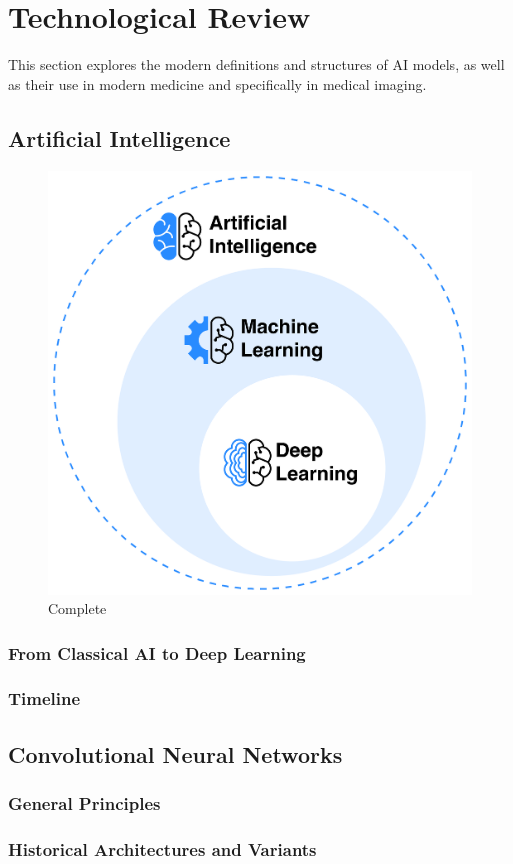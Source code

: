 \documentclass[a4paper,10pt]{book}
\begin{document}
\chapter{Technological Review}

This section explores the modern definitions and structures of AI models, as well as their use in modern medicine and specifically in medical imaging.

\section{Artificial Intelligence}

\begin{figure}[h]
    \centering
    \includegraphics[width=0.5\linewidth]{reports//assets/ai.png}
    \caption{Complete}
    \label{fig:enter-label}
\end{figure}

\subsection{From Classical AI to Deep Learning}
\subsection{Timeline}

\section{Convolutional Neural Networks}
\subsection{General Principles}
\subsection{Historical Architectures and Variants}
\end{document}
